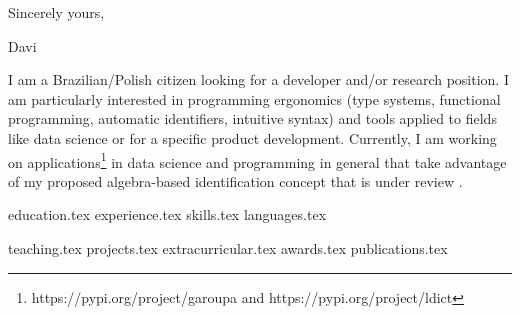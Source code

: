 \documentclass[letterpaper,11pt]{article}
\begin{document}
{\justifying
\Large
{}
\vspace{30pt}
\hspace{420pt} Sincerely yours,
\vspace{10pt}

\hspace{420pt} Davi
}

\newpage


\vspace{0.35cm}
{\justifying
I am a Brazilian/Polish citizen looking for a developer and/or research position. 
I am particularly interested in programming ergonomics (type systems, functional programming, automatic identifiers, intuitive syntax) and tools applied to fields like data science or for a specific product development.
Currently, I am working on applications\footnote{https://pypi.org/project/garoupa and https://pypi.org/project/ldict} in data science and programming in general that take advantage of my proposed algebra-based identification concept that is under review \cite{pereirasantos2021predictable}. %
}

{education.tex}
{experience.tex}
\sidebyside
    {{skills.tex}}
    {{languages.tex}}


{teaching.tex}
{projects.tex}
{extracurricular.tex}
\newpage
{awards.tex}
{publications.tex}
\end{document}
